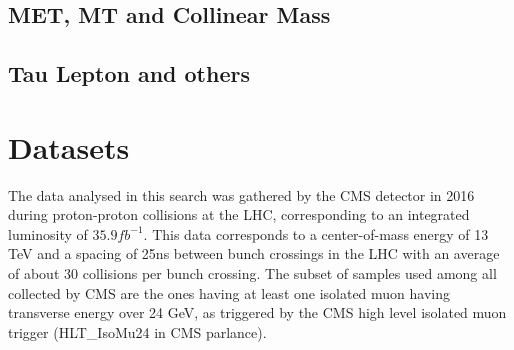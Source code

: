 \subsection{MET, MT and Collinear Mass}
\label{col_mass}
\subsection{Tau Lepton and others}
\label{tau_recon}


\section{Datasets}
\label{datasets}

The data analysed in this search was gathered by the CMS detector in 2016 during proton-proton collisions at the LHC, corresponding to an integrated luminosity of $35.9 fb^{-1}$. This data corresponds to a center-of-mass energy of 13 TeV and a spacing of 25ns between bunch crossings in the LHC with an average of about 30 collisions per bunch crossing. The subset of samples used among all collected by CMS are the ones having at least one isolated muon having transverse energy over 24 GeV, as triggered by the CMS high level isolated muon trigger (HLT\_IsoMu24 in CMS parlance).




%
% 
% 

%
% 
% 
